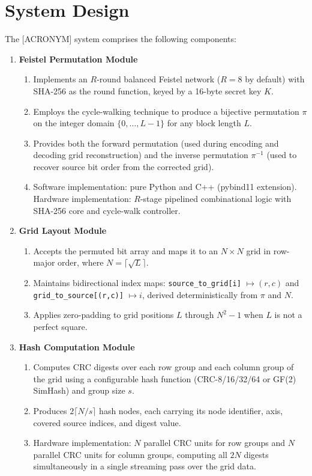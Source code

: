 \chapter*{System Design}
The [ACRONYM] system comprises the following components:

\begin{enumerate}

    \item \textbf{Feistel Permutation Module}
        \begin{enumerate}
            \item Implements an $R$-round balanced Feistel network ($R=8$ by default) with SHA-256 as the round function, keyed by a 16-byte secret key $K$.
            \item Employs the cycle-walking technique to produce a bijective permutation $\pi$ on the integer domain $\{0, \ldots, L-1\}$ for any block length $L$.
            \item Provides both the forward permutation (used during encoding and decoding grid reconstruction) and the inverse permutation $\pi^{-1}$ (used to recover source bit order from the corrected grid).
            \item Software implementation: pure Python and C++ (pybind11 extension). Hardware implementation: $R$-stage pipelined combinational logic with SHA-256 core and cycle-walk controller.
        \end{enumerate}

    \item \textbf{Grid Layout Module}
        \begin{enumerate}
            \item Accepts the permuted bit array and maps it to an $N \times N$ grid in row-major order, where $N = \lceil\sqrt{L}\rceil$.
            \item Maintains bidirectional index maps: \texttt{source\_to\_grid[i]} $\mapsto (r, c)$ and \texttt{grid\_to\_source[(r,c)]} $\mapsto i$, derived deterministically from $\pi$ and $N$.
            \item Applies zero-padding to grid positions $L$ through $N^2 - 1$ when $L$ is not a perfect square.
        \end{enumerate}

    \item \textbf{Hash Computation Module}
        \begin{enumerate}
            \item Computes CRC digests over each row group and each column group of the grid using a configurable hash function (CRC-8/16/32/64 or GF(2) SimHash) and group size $s$.
            \item Produces $2\lceil N/s \rceil$ hash nodes, each carrying its node identifier, axis, covered source indices, and digest value.
            \item Hardware implementation: $N$ parallel CRC units for row groups and $N$ parallel CRC units for column groups, computing all $2N$ digests simultaneously in a single streaming pass over the grid data.
        \end{enumerate}


\end{enumerate}
